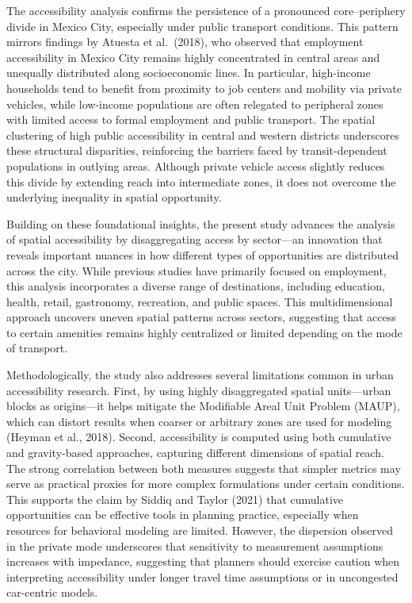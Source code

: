 \documentclass[
  12pt,
]{report}
\begin{document}
The accessibility analysis confirms the persistence of a pronounced
core--periphery divide in Mexico City, especially under public transport
conditions. This pattern mirrors findings by Atuesta et al.~(2018), who
observed that employment accessibility in Mexico City remains highly
concentrated in central areas and unequally distributed along
socioeconomic lines. In particular, high-income households tend to
benefit from proximity to job centers and mobility via private vehicles,
while low-income populations are often relegated to peripheral zones
with limited access to formal employment and public transport. The
spatial clustering of high public accessibility in central and western
districts underscores these structural disparities, reinforcing the
barriers faced by transit-dependent populations in outlying areas.
Although private vehicle access slightly reduces this divide by
extending reach into intermediate zones, it does not overcome the
underlying inequality in spatial opportunity.

Building on these foundational insights, the present study advances the
analysis of spatial accessibility by disaggregating access by
sector---an innovation that reveals important nuances in how different
types of opportunities are distributed across the city. While previous
studies have primarily focused on employment, this analysis incorporates
a diverse range of destinations, including education, health, retail,
gastronomy, recreation, and public spaces. This multidimensional
approach uncovers uneven spatial patterns across sectors, suggesting
that access to certain amenities remains highly centralized or limited
depending on the mode of transport.

Methodologically, the study also addresses several limitations common in
urban accessibility research. First, by using highly disaggregated
spatial units---urban blocks as origins---it helps mitigate the
Modifiable Areal Unit Problem (MAUP), which can distort results when
coarser or arbitrary zones are used for modeling (Heyman et al., 2018).
Second, accessibility is computed using both cumulative and
gravity-based approaches, capturing different dimensions of spatial
reach. The strong correlation between both measures suggests that
simpler metrics may serve as practical proxies for more complex
formulations under certain conditions. This supports the claim by Siddiq
and Taylor (2021) that cumulative opportunities can be effective tools
in planning practice, especially when resources for behavioral modeling
are limited. However, the dispersion observed in the private mode
underscores that sensitivity to measurement assumptions increases with
impedance, suggesting that planners should exercise caution when
interpreting accessibility under longer travel time assumptions or in
uncongested car-centric models.
\end{document}
